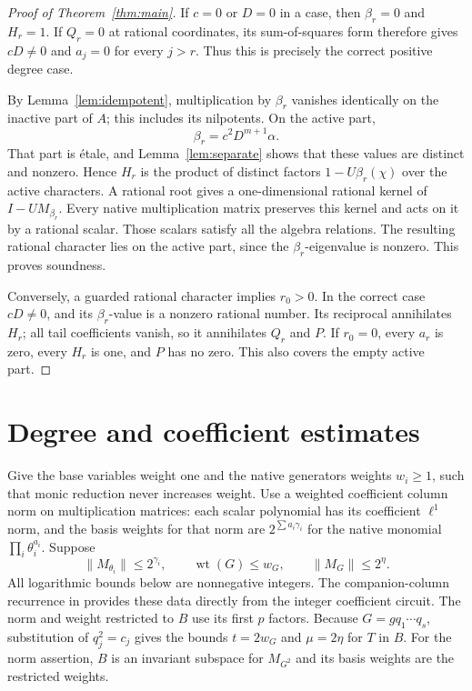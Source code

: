 \documentclass[11pt,a4paper]{article}
\begin{document}
\begin{proof}[Proof of Theorem~\ref{thm:main}]
If $c=0$ or $D=0$ in a case, then $\beta_r=0$ and $H_r=1$.
If $Q_r=0$ at rational coordinates, its sum-of-squares form
therefore gives $cD\ne0$ and $a_j=0$ for every $j>r$.
Thus this is precisely the correct positive degree case.

By Lemma~\ref{lem:idempotent}, multiplication by $\beta_r$
vanishes identically on the inactive part of $A$; this
includes its nilpotents. On the active part,
\[
                       \beta_r=c^2D^{m+1}\alpha.
\]
That part is \'etale, and Lemma~\ref{lem:separate} shows that
these values are distinct and nonzero. Hence $H_r$ is the
product of distinct factors $1-U\beta_r(\chi)$ over the active
characters. A rational root gives a one-dimensional rational
kernel of $I-UM_{\beta_r}$. Every native multiplication matrix
preserves this kernel and acts on it by a rational scalar.
Those scalars satisfy all the algebra relations. The resulting
rational character lies on the active part, since the
$\beta_r$-eigenvalue is nonzero. This proves soundness.

Conversely, a guarded rational character implies $r_0>0$.
In the correct case $cD\ne0$, and its $\beta_r$-value is a
nonzero rational number. Its reciprocal annihilates $H_r$;
all tail coefficients vanish, so it annihilates $Q_r$ and
$P$. If $r_0=0$, every $a_r$ is zero, every $H_r$ is one,
and $P$ has no zero. This also covers the empty active part.
\end{proof}

\section{Degree and coefficient estimates}

Give the base variables weight one and the native generators
weights $w_i\ge1$, such that monic reduction never increases
weight. Use a weighted coefficient column norm on multiplication
matrices: each scalar polynomial has its coefficient $\ell^1$
norm, and the basis weights for that norm are
$2^{\sum a_i\gamma_i}$ for the native monomial
$\prod_i\theta_i^{a_i}$. Suppose
\[
 \|M_{\theta_i}\|\le2^{\gamma_i},\qquad
 \operatorname{wt}(G)\le w_G,\qquad \|M_G\|\le2^\eta.
\]
All logarithmic bounds below are nonnegative integers.
The companion-column recurrence in \cite{Weighted}
provides these data directly from the integer coefficient circuit.
The norm and weight restricted to $B$ use its first $p$ factors.
Because $G=gq_1\cdots q_s$, substitution of $q_j^2=c_j$
gives the bounds $t=2w_G$ and $\mu=2\eta$ for $T$ in $B$.
For the norm assertion, $B$ is an invariant subspace for
$M_{G^2}$ and its basis weights are the restricted weights.
\end{document}
